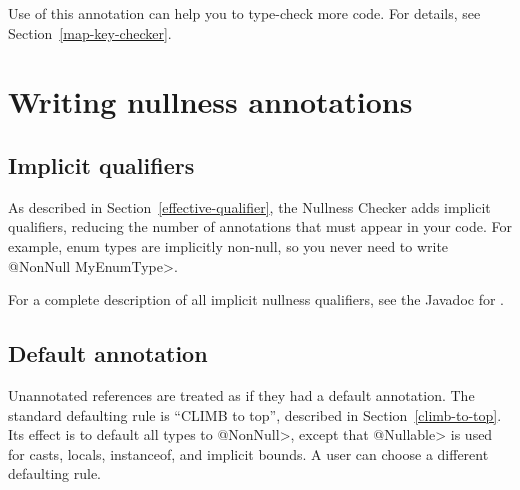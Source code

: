 Use of this annotation can help you to type-check more code.  For details,
see Section~\ref{map-key-checker}.


\section{Writing nullness annotations\label{writing-nullness-annotations}}

\subsection{Implicit qualifiers\label{nullness-implicit-qualifiers}}

As described in Section~\ref{effective-qualifier}, the Nullness Checker
adds implicit qualifiers, reducing the number of annotations that must
appear in your code.
For example, enum types are implicitly non-null, so you never need to write
\<@NonNull MyEnumType>.

For a complete description of all implicit nullness qualifiers, see the
Javadoc for .



\subsection{Default annotation\label{null-defaults}}

Unannotated references are treated as if they had a default annotation.
The standard defaulting rule is  ``CLIMB to top'',  described in
Section~\ref{climb-to-top}.  Its effect is to default all types to
\<@NonNull>, except that \<@Nullable> is used for casts, locals,
instanceof, and implicit bounds.  A user can choose a different defaulting
rule.

